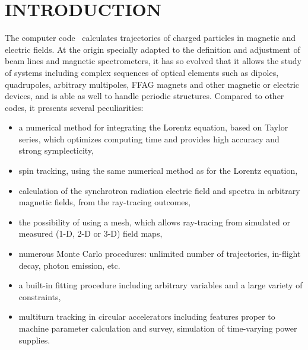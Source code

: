 
      \pagestyle{headings}


\section*{INTRODUCTION} 

The computer code \zgou\  calculates trajectories of
charged particles in magnetic and electric fields.  At the origin specially adapted to the definition and adjustment of 
beam lines and magnetic spectrometers, it has so evolved that it allows the study of systems including complex
 sequences of optical elements such as dipoles, quadrupoles, 
 arbitrary multipoles, FFAG magnets and other magnetic or electric
 devices, and is able as well to handle periodic structures.  Compared to other codes, it presents several peculiarities: 
\begin{itemize}
\item a numerical method for integrating the Lorentz equation, based on Taylor series,
	which optimizes computing time and provides high accuracy and strong symplecticity,
\item spin tracking, using the same numerical method as for the Lorentz equation,
\item calculation of the synchrotron radiation electric field and 
spectra in arbitrary magnetic fields, from the ray-tracing outcomes,
\item the possibility of using a mesh, which allows ray-tracing from
	simulated or measured (1-D, 2-D or 3-D) field maps, 
\item numerous Monte Carlo procedures: unlimited number of trajectories, in-flight decay, 
photon emission, etc. 
\item a built-in fitting procedure including arbitrary variables and a large variety of 
constraints, 
\item multiturn tracking in circular accelerators including  features proper to machine 
parameter calculation and survey,  simulation of time-varying power  supplies. 
\end{itemize}

